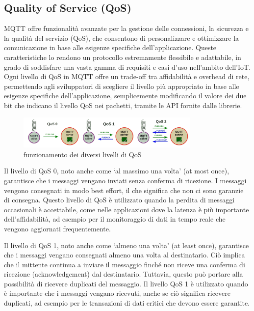\documentclass[12pt,a4paper,openright,twoside]{book}
\begin{document}
\subsection{Quality of Service (QoS)}

\ac{MQTT} offre funzionalità avanzate per la gestione delle connessioni, la sicurezza e la qualità del servizio (\ac{QoS}), che consentono di personalizzare e ottimizzare 
la comunicazione in base alle esigenze specifiche dell'applicazione. Queste caratteristiche lo rendono un protocollo estremamente flessibile e adattabile, 
in grado di soddisfare una vasta gamma di requisiti e casi d'uso nell'ambito dell'\ac{IoT}. 
Ogni livello di \ac{QoS} in \ac{MQTT} offre un trade-off tra affidabilità e overhead di rete, permettendo agli sviluppatori di scegliere il livello più appropriato in base alle esigenze 
specifiche dell'applicazione, semplicemente modificando il valore dei due bit che indicano il livello \ac{QoS} nei pachetti, tramite le API fornite dalle librerie. 

\begin{figure}[H]
    \centering
    \includegraphics[width=0.8\textwidth]{figures/mqtt-qos.png}
    \caption{funzionamento dei diversi livelli di QoS \cite{mqtt_QoS}}
    \label{fig:mqtt-qos}
\end{figure}

Il livello di \ac{QoS} 0, noto anche come `al massimo una volta' (at most once), garantisce che i messaggi vengano inviati senza conferma di ricezione. 
I messaggi vengono consegnati in modo best effort, il che significa che non ci sono garanzie di consegna. Questo livello di \ac{QoS} è utilizzato quando la perdita 
di messaggi occasionali è accettabile, come nelle applicazioni dove la latenza è più importante dell'affidabilità, ad esempio per il monitoraggio di dati in tempo reale 
che vengono aggiornati frequentemente.

Il livello di \ac{QoS} 1, noto anche come `almeno una volta' (at least once), garantisce che i messaggi vengano consegnati almeno una volta al destinatario. Ciò implica 
che il mittente continua a inviare il messaggio finché non riceve una conferma di ricezione (acknowledgement) dal destinatario. Tuttavia, questo può portare alla possibilità 
di ricevere duplicati del messaggio. Il livello \ac{QoS} 1 è utilizzato quando è importante che i messaggi vengano ricevuti, anche se ciò significa ricevere duplicati, 
ad esempio per le transazioni di dati critici che devono essere garantite.
\end{document}
